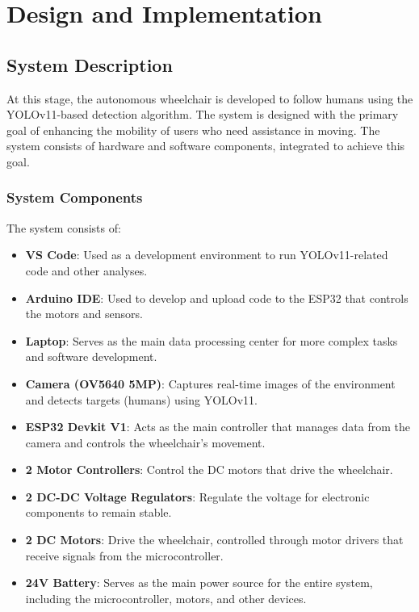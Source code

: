 \section{Design and Implementation}
\label{sec:designandimplementation}

\subsection{System Description}
\label{sec:systemdescription}

At this stage, the autonomous wheelchair is developed to follow humans using the YOLOv11-based detection algorithm. The system is designed with the primary goal of enhancing the mobility of users who need assistance in moving. The system consists of hardware and software components, integrated to achieve this goal.

\vspace{5pt}
\subsubsection{System Components}
\label{subsubsec:systemcomponents}

The system consists of:

\begin{itemize}
    \item \textbf{VS Code}: Used as a development environment to run YOLOv11-related code and other analyses.
    \item \textbf{Arduino IDE}: Used to develop and upload code to the ESP32 that controls the motors and sensors.
    \item \textbf{Laptop}: Serves as the main data processing center for more complex tasks and software development.
    \item \textbf{Camera (OV5640 5MP)}: Captures real-time images of the environment and detects targets (humans) using YOLOv11.
    \item \textbf{ESP32 Devkit V1}: Acts as the main controller that manages data from the camera and controls the wheelchair's movement.
    \item \textbf{2 Motor Controllers}: Control the DC motors that drive the wheelchair.
    \item \textbf{2 DC-DC Voltage Regulators}: Regulate the voltage for electronic components to remain stable.
    \item \textbf{2 DC Motors}: Drive the wheelchair, controlled through motor drivers that receive signals from the microcontroller.
    \item \textbf{24V Battery}: Serves as the main power source for the entire system, including the microcontroller, motors, and other devices.
\end{itemize}

